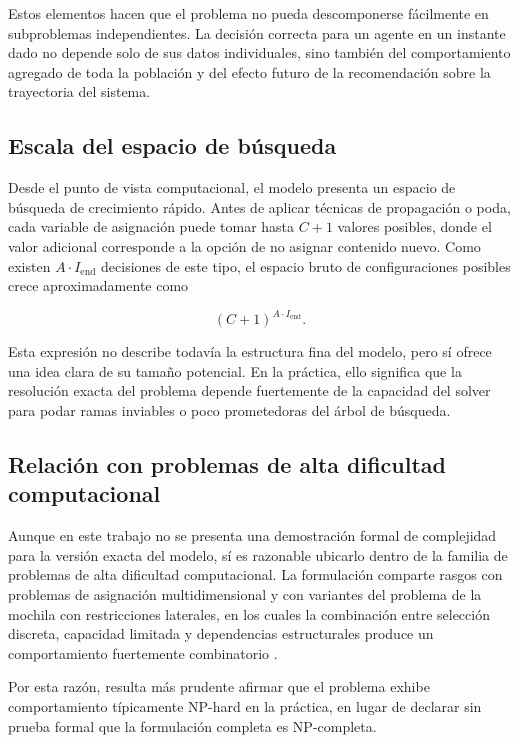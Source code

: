 \documentclass[10pt,letterpaper]{article}
\begin{document}
Estos elementos hacen que el problema no pueda descomponerse f\'acilmente en subproblemas independientes. La decisi\'on correcta para un agente en un instante dado no depende solo de sus datos individuales, sino tambi\'en del comportamiento agregado de toda la poblaci\'on y del efecto futuro de la recomendaci\'on sobre la trayectoria del sistema.

\subsection{Escala del espacio de b\'usqueda}

Desde el punto de vista computacional, el modelo presenta un espacio de b\'usqueda de crecimiento r\'apido. Antes de aplicar t\'ecnicas de propagaci\'on o poda, cada variable de asignaci\'on puede tomar hasta \(C+1\) valores posibles, donde el valor adicional corresponde a la opci\'on de no asignar contenido nuevo. Como existen \(A \cdot I_{\text{end}}\) decisiones de este tipo, el espacio bruto de configuraciones posibles crece aproximadamente como

\[
(C+1)^{A \cdot I_{\text{end}}}.
\]

Esta expresi\'on no describe todav\'ia la estructura fina del modelo, pero s\'i ofrece una idea clara de su tama\~no potencial. En la pr\'actica, ello significa que la resoluci\'on exacta del problema depende fuertemente de la capacidad del solver para podar ramas inviables o poco prometedoras del \'arbol de b\'usqueda.

\subsection{Relaci\'on con problemas de alta dificultad computacional}

Aunque en este trabajo no se presenta una demostraci\'on formal de complejidad para la versi\'on exacta del modelo, s\'i es razonable ubicarlo dentro de la familia de problemas de alta dificultad computacional. La formulaci\'on comparte rasgos con problemas de asignaci\'on multidimensional y con variantes del problema de la mochila con restricciones laterales, en los cuales la combinaci\'on entre selecci\'on discreta, capacidad limitada y dependencias estructurales produce un comportamiento fuertemente combinatorio \cite{martello-monaci-2018,szkaliczki2025}.

Por esta raz\'on, resulta m\'as prudente afirmar que el problema exhibe comportamiento t\'ipicamente NP-hard en la pr\'actica, en lugar de declarar sin prueba formal que la formulaci\'on completa es NP-completa. 
\end{document}
